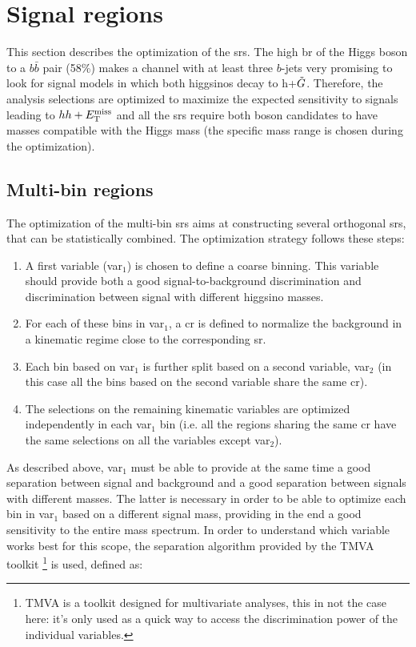 \FloatBarrier

\section{Signal regions}
\label{sec:ewk:SR}

This section describes the optimization of the \glspl{sr}. 
The high \gls{br} of the Higgs boson to a $b\bar{b}$ pair (58\%) makes a channel with at least three $b$-jets very 
promising to look for signal models 
in which both higgsinos decay to h+$\tilde{G}$. 
Therefore, the analysis selections are optimized to maximize the expected sensitivity to signals leading to $hh+E_{\rm T}^{\mathrm{miss}}$ 
and all the \glspl{sr} require both boson candidates to have masses compatible with the Higgs mass (the specific mass range is chosen during the optimization). 

\subsection{Multi-bin regions}
\label{sec:ewk:multibin}

The optimization of the multi-bin \glspl{sr} aims at constructing several orthogonal \glspl{sr}, that can be statistically combined. 
The optimization strategy follows these steps:
\begin{enumerate}
\item A first variable (var$_1$) is chosen to define a coarse binning. 
    This variable should provide both a good signal-to-background discrimination and discrimination between signal 
    with different higgsino masses.
\item For each of these bins in var$_1$, a \gls{cr} is defined to normalize the \ttbar background in a kinematic regime close to the corresponding \gls{sr}.
\item Each bin based on var$_1$ is further split based on a second variable, var$_2$ (in this case all the bins based on the second variable share the same \gls{cr}).
\item The selections on the remaining kinematic variables are optimized independently in each var$_1$ bin (i.e. all the regions sharing the same 
\gls{cr} have the same selections on all the variables except var$_2$).
\end{enumerate}

\noindent As described above, var$_1$ must be able to provide at the same time a good separation between signal and background 
and a good separation between signals with different \hino masses. 
The latter is necessary in order to be able to optimize each bin in var$_1$ based on a different signal mass, 
providing in the end a good sensitivity to the entire mass spectrum. 
In order to understand which variable works best for this scope, the separation algorithm provided by the TMVA toolkit \footnote{TMVA is a toolkit designed for multivariate analyses, this in not the case here: it's only used as a quick way to access the discrimination power of the individual variables.} \cite{Hocker:2007ht} is used, defined as:

